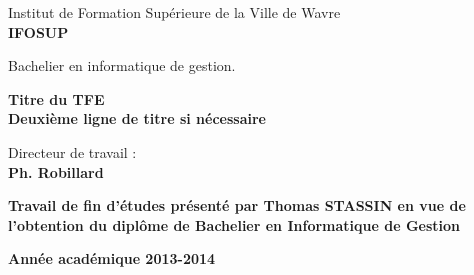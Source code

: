 \begin{titlepage}
\vfill


\begin{center}
\Large{Institut de Formation Supérieure de la Ville de Wavre}\\

\textbf{\Huge{IFOSUP}}
\end{center}

\begin{center}
\LARGE{Bachelier en informatique de gestion.}
\end{center}

\vfill

\begin{center}
\bf
\LARGE{Titre du TFE}\\
\Large{Deuxième ligne de titre si nécessaire}
\end{center}

\vfill


\begin{flushleft}
Directeur de travail :\\
\textbf{Ph. Robillard}
\end{flushleft}

\begin{flushright}
\bf
Travail de fin d'études présenté par Thomas STASSIN en vue de l'obtention du diplôme de Bachelier en Informatique de Gestion
\end{flushright}

\begin{center}
\textbf{Année académique 2013-2014}
\end{center}


\end{titlepage}